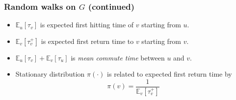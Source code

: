 \documentclass[professionalfonts,hyperref={colorlinks=true,lincolor=cyan}]{beamer}
\begin{document}
\begin{frame}
  \frametitle{Random walks on $G$ (continued)}
  \begin{itemize}[<+->]
  \item $\mathbb{E}_{u}[\tau_v]$ is expected first hitting time of $v$ starting from $u$.
  \item $\mathbb{E}_{v}[\tau_v^{+}]$ is expected first return time to $v$ starting from $v$.
  \item $\mathbb{E}_{u}[\tau_v] + \mathbb{E}_{v}[\tau_u]$ is {\em mean
      commute time} between $u$ and $v$.
  \item Stationary distribution $\pi(\cdot)$ is related to expected
    first return time by
    \begin{equation}
      \label{eq:2}
      \pi(v) = \frac{1}{\mathbb{E}_v[\tau_v^{+}]}
    \end{equation}

  \end{itemize}
\end{frame}
\end{document}
